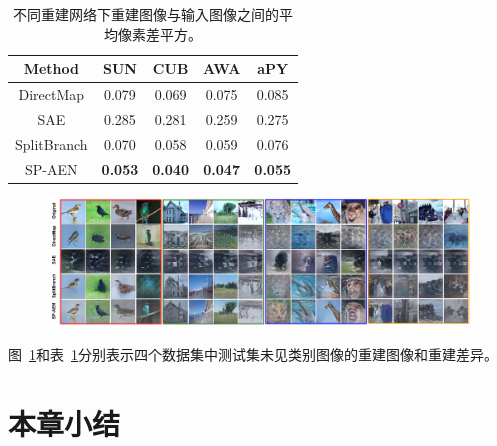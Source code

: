 \begin{table}[htbp]
\centering
\begin{tabular}{|c c| c| c| c|}
\hline
Method & \textbf{SUN} & \textbf{CUB} & \textbf{AWA} & \textbf{aPY} \\
\hline
 DirectMap & 0.079 & 0.069 & 0.075 & 0.085 \\
 SAE & 0.285 & 0.281 & 0.259 &  0.275\\
SplitBranch & 0.070 & 0.058  & 0.059 & 0.076 \\
SP-AEN & \textbf{0.053}  & \textbf{0.040}& \textbf{0.047} & \textbf{0.055} \\
\hline
\end{tabular}
\caption{不同重建网络下重建图像与输入图像之间的平均像素差平方。}
\label{ch3:tab:conflict_quantitative}
\end{table}


\begin{figure}[htbp]
    \centering
        \includegraphics[width=\linewidth]{chapter3/res/conflict_visualization.pdf}
    \label{ch3:fig:conflict_visualization}
\end{figure}

图~\ref{ch3:fig:conflict_visualization}和表~\ref{ch3:tab:conflict_quantitative}分别表示四个数据集中测试集未见类别图像的重建图像和重建差异。




\section{本章小结}